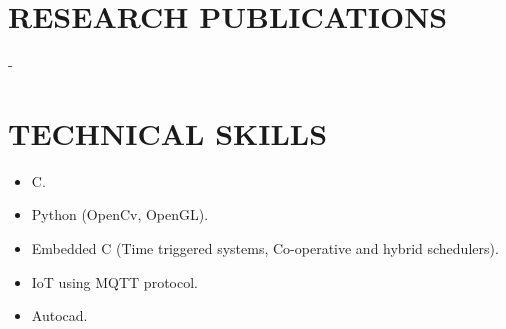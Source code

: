 \documentclass{article}
\begin{document}
\section*{\textbf{RESEARCH PUBLICATIONS}}
-

\section*{\textbf{TECHNICAL SKILLS}}
\begin{itemize}
\item C.
\item Python (OpenCv, OpenGL).
\item Embedded C (Time triggered systems, Co-operative and hybrid schedulers).
\item IoT using MQTT protocol.
\item Autocad.
\end{itemize}
\end{document}
